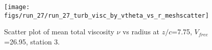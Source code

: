 \begin{figure}[H]
\centering
\texttt{[image: figs/run\_27/run\_27\_turb\_visc\_by\_vtheta\_vs\_r\_meshscatter]}
\caption{Scatter plot of mean total viscosity $\nu$ vs radius at $z/c$=7.75, $V_{free}$=26.95, station 3.}
\label{fig:run_27_turb_visc_by_vtheta_vs_r_meshscatter}
\end{figure}


